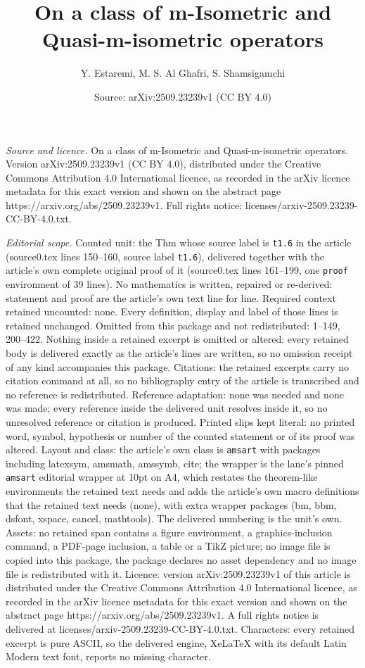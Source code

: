 \documentclass[10pt,a4paper]{amsart}
\title[On a class of m-Isometric and Quasi-m-isometric operators]{On a class of m-Isometric and Quasi-m-isometric operators}
\author{Y. Estaremi, M. S. Al Ghafri, S. Shamsigamchi}
\date{Source: arXiv:2509.23239v1 (CC BY 4.0)}
\begin{document}
\maketitle

\noindent\emph{Source and licence.} On a class of m-Isometric and Quasi-m-isometric operators. Version arXiv:2509.23239v1 (CC BY 4.0), distributed under the Creative Commons Attribution 4.0 International licence, as recorded in the arXiv licence metadata for this exact version and shown on the abstract page https://arxiv.org/abs/2509.23239v1. Full rights notice: licenses/arxiv-2509.23239-CC-BY-4.0.txt.\par\smallskip

\noindent\textit{Editorial scope.} Counted unit: the Thm whose source label is \texttt{t1.6} in the article (source0.tex lines 150--160, source label \texttt{t1.6}), delivered together with the article's own complete original proof of it (source0.tex lines 161--199, one \texttt{proof} environment of 39 lines). No mathematics is written, repaired or re-derived: statement and proof are the article's own text line for line. Required context retained uncounted: none. Every definition, display and label of those lines is retained unchanged. Omitted from this package and not redistributed: 1--149, 200--422. Nothing inside a retained excerpt is omitted or altered: every retained body is delivered exactly as the article's lines are written, so no omission receipt of any kind accompanies this package. Citations: the retained excerpts carry no citation command at all, so no bibliography entry of the article is transcribed and no reference is redistributed. Reference adaptation: none was needed and none was made; every reference inside the delivered unit resolves inside it, so no unresolved reference or citation is produced. Printed slips kept literal: no printed word, symbol, hypothesis or number of the counted statement or of its proof was altered. Layout and class: the article's own class is \texttt{amsart} with packages including latexsym, amsmath, amssymb, cite; the wrapper is the lane's pinned \texttt{amsart} editorial wrapper at 10pt on A4, which restates the theorem-like environments the retained text needs and adds the article's own macro definitions that the retained text needs (none), with extra wrapper packages (bm, bbm, dsfont, xspace, cancel, mathtools). The delivered numbering is the unit's own. Assets: no retained span contains a figure environment, a graphics-inclusion command, a PDF-page inclusion, a table or a TikZ picture; no image file is copied into this package, the package declares no asset dependency and no image file is redistributed with it. Licence: version arXiv:2509.23239v1 of this article is distributed under the Creative Commons Attribution 4.0 International licence, as recorded in the arXiv licence metadata for this exact version and shown on the abstract page https://arxiv.org/abs/2509.23239v1. A full rights notice is delivered at licenses/arxiv-2509.23239-CC-BY-4.0.txt. Characters: every retained excerpt is pure ASCII, so the delivered engine, XeLaTeX with its default Latin Modern text font, reports no missing character.
\end{document}
